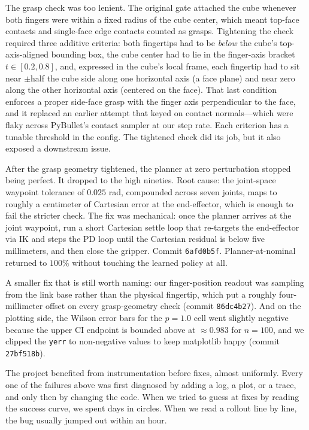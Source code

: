 \documentclass[letterpaper, 11 pt, journal, twoside]{IEEEtran}
\begin{document}
The grasp check was too lenient. The original gate attached the cube whenever both fingers were within a fixed radius of the cube center, which meant top-face contacts and single-face edge contacts counted as grasps. Tightening the check required three additive criteria: both fingertips had to be \emph{below} the cube's top-axis-aligned bounding box, the cube center had to lie in the finger-axis bracket $t \in [0.2, 0.8]$, and, expressed in the cube's local frame, each fingertip had to sit near $\pm{}$half the cube side along one horizontal axis (a face plane) and near zero along the other horizontal axis (centered on the face). That last condition enforces a proper side-face grasp with the finger axis perpendicular to the face, and it replaced an earlier attempt that keyed on contact normals---which were flaky across PyBullet's contact sampler at our step rate. Each criterion has a tunable threshold in the config. The tightened check did its job, but it also exposed a downstream issue.

After the grasp geometry tightened, the planner at zero perturbation stopped being perfect. It dropped to the high nineties. Root cause: the joint-space waypoint tolerance of $0.025$ rad, compounded across seven joints, maps to roughly a centimeter of Cartesian error at the end-effector, which is enough to fail the stricter check. The fix was mechanical: once the planner arrives at the joint waypoint, run a short Cartesian settle loop that re-targets the end-effector via IK and steps the PD loop until the Cartesian residual is below five millimeters, and then close the gripper. Commit {\tt 6afd0b5f}. Planner-at-nominal returned to $100\%$ without touching the learned policy at all.

A smaller fix that is still worth naming: our finger-position readout was sampling from the link base rather than the physical fingertip, which put a roughly four-millimeter offset on every grasp-geometry check (commit {\tt 86dc4b27}). And on the plotting side, the Wilson error bars for the $p = 1.0$ cell went slightly negative because the upper CI endpoint is bounded above at $\approx 0.983$ for $n = 100$, and we clipped the {\tt yerr} to non-negative values to keep matplotlib happy (commit {\tt 27bf518b}).

The project benefited from instrumentation before fixes, almost uniformly. Every one of the failures above was first diagnosed by adding a log, a plot, or a trace, and only then by changing the code. When we tried to guess at fixes by reading the success curve, we spent days in circles. When we read a rollout line by line, the bug usually jumped out within an hour.
\end{document}
